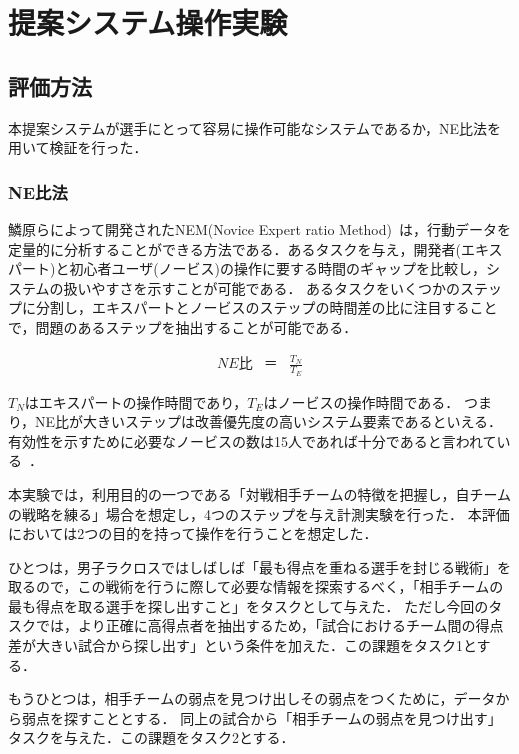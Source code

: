 \documentclass[sotsuron]{kuee}
\begin{document}
	\section{提案システム操作実験}
		\subsection{評価方法}
			本提案システムが選手にとって容易に操作可能なシステムであるか，NE比法を用いて検証を行った．
				\subsubsection{NE比法}
					鱗原らによって開発されたNEM(Novice Expert ratio Method)~\cite{NEM}は，行動データを定量的に分析することができる方法である．あるタスクを与え，開発者(エキスパート)と初心者ユーザ(ノービス)の操作に要する時間のギャップを比較し，システムの扱いやすさを示すことが可能である．
					あるタスクをいくつかのステップに分割し，エキスパートとノービスのステップの時間差の比に注目することで，問題のあるステップを抽出することが可能である．

					\begin{eqnarray}
						NE比 & ＝ & \frac{T_N}{T_E}
					\end{eqnarray}
					
					$T_N$はエキスパートの操作時間であり，$T_E$はノービスの操作時間である．
					つまり，NE比が大きいステップは改善優先度の高いシステム要素であるといえる．
					有効性を示すために必要なノービスの数は15人であれば十分であると言われている~\cite{Nielsen}．
					
					本実験では，利用目的の一つである「対戦相手チームの特徴を把握し，自チームの戦略を練る」場合を想定し，4つのステップを与え計測実験を行った．
					本評価においては2つの目的を持って操作を行うことを想定した．
					
					ひとつは，男子ラクロスではしばしば「最も得点を重ねる選手を封じる戦術」を取るので，この戦術を行うに際して必要な情報を探索するべく，「相手チームの最も得点を取る選手を探し出すこと」をタスクとして与えた．
					ただし今回のタスクでは，より正確に高得点者を抽出するため，「試合におけるチーム間の得点差が大きい試合から探し出す」という条件を加えた．この課題をタスク1とする．
					
					もうひとつは，相手チームの弱点を見つけ出しその弱点をつくために，データから弱点を探すこととする．
					同上の試合から「相手チームの弱点を見つけ出す」タスクを与えた．この課題をタスク2とする．
					
\end{document}
